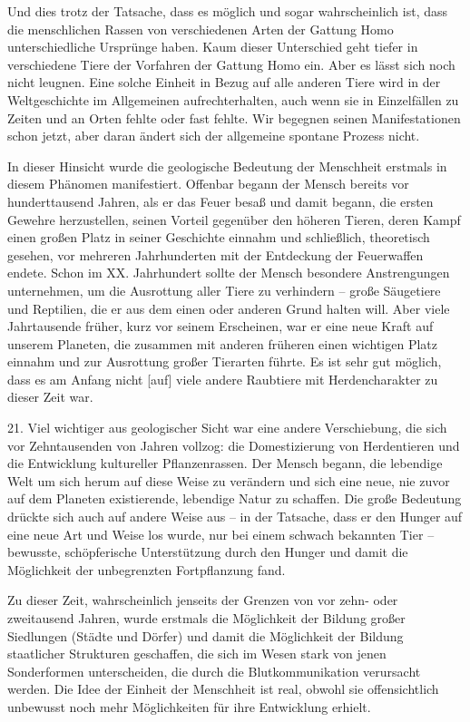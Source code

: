 \documentclass[11pt,a4paper]{book}
\begin{document}
Und dies trotz der Tatsache, dass es möglich und sogar wahrscheinlich ist, dass die menschlichen Rassen von verschiedenen Arten der Gattung Homo unterschiedliche Ursprünge haben. Kaum dieser Unterschied geht tiefer in verschiedene Tiere der Vorfahren der Gattung Homo ein. Aber es lässt sich noch nicht leugnen. Eine solche Einheit in Bezug auf alle anderen Tiere wird in der Weltgeschichte im Allgemeinen aufrechterhalten, auch wenn sie in Einzelfällen zu Zeiten und an Orten fehlte oder fast fehlte. Wir begegnen seinen Manifestationen schon jetzt, aber daran ändert sich der allgemeine spontane Prozess nicht. 

In dieser Hinsicht wurde die geologische Bedeutung der Menschheit erstmals in diesem Phänomen manifestiert. Offenbar begann der Mensch bereits vor hunderttausend Jahren, als er das Feuer besaß und damit begann, die ersten Gewehre herzustellen, seinen Vorteil gegenüber den höheren Tieren, deren Kampf einen großen Platz in seiner Geschichte einnahm und schließlich, theoretisch gesehen, vor mehreren Jahrhunderten mit der Entdeckung der Feuerwaffen endete. Schon im XX. Jahrhundert sollte der Mensch besondere Anstrengungen unternehmen, um die Ausrottung aller Tiere zu verhindern -- große Säugetiere und Reptilien, die er aus dem einen oder anderen Grund halten will. Aber viele Jahrtausende früher, kurz vor seinem Erscheinen, war er eine neue Kraft auf unserem Planeten, die zusammen mit anderen früheren einen wichtigen Platz einnahm und zur Ausrottung großer Tierarten führte. Es ist sehr gut möglich, dass es am Anfang nicht [auf] viele andere Raubtiere mit Herdencharakter zu dieser Zeit war. 

21. Viel wichtiger aus geologischer Sicht war eine andere Verschiebung, die sich vor Zehntausenden von Jahren vollzog: die Domestizierung von Herdentieren und die Entwicklung kultureller Pflanzenrassen. Der Mensch begann, die lebendige Welt um sich herum auf diese Weise zu verändern und sich eine neue, nie zuvor auf dem Planeten existierende, lebendige Natur zu schaffen. Die große Bedeutung drückte sich auch auf andere Weise aus -- in der Tatsache, dass er den Hunger auf eine neue Art und Weise los wurde, nur bei einem schwach bekannten Tier -- bewusste, schöpferische Unterstützung durch den Hunger und damit die Möglichkeit der unbegrenzten Fortpflanzung fand. 

Zu dieser Zeit, wahrscheinlich jenseits der Grenzen von vor zehn- oder zweitausend Jahren, wurde erstmals die Möglichkeit der Bildung großer Siedlungen (Städte und Dörfer) und damit die Möglichkeit der Bildung staatlicher Strukturen geschaffen, die sich im Wesen stark von jenen Sonderformen unterscheiden, die durch die Blutkommunikation verursacht werden. Die Idee der Einheit der Menschheit ist real, obwohl sie offensichtlich unbewusst noch mehr Möglichkeiten für ihre Entwicklung erhielt. 
\end{document}
